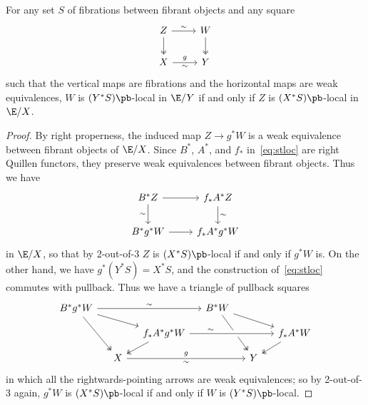 \begin{lem}\label{thm:fl-we}
  For any set $S$ of fibrations between fibrant objects and any square
  \[
    \begin{tikzcd}
      Z \ar[d,two heads] \ar[r,"\sim"] & W \ar[d,two heads] \\
      X \ar[r,"g","\sim"'] & Y
    \end{tikzcd}
  \]
  such that the vertical maps are fibrations and the horizontal maps are weak equivalences, $W$ is $(Y^*S)\pb$-local in $\E/Y$ if and only if $Z$ is $(X^*S)\pb$-local in $\E/X$.
\end{lem}
\begin{proof}
  By right properness, the induced map $Z \to g^*W$ is a weak equivalence between fibrant objects of $\E/X$.
  Since $B^*$, $A^*$, and $f_*$ in~\eqref{eq:stloc} are right Quillen functors, they preserve weak equivalences between fibrant objects.
  Thus we have
  \[
    \begin{tikzcd}
      B^*Z \ar[r] \ar[d,"\sim"'] & f_*A^* Z \ar[d,"\sim"] \\
      B^*g^*W \ar[r] & f_* A^* g^* W 
    \end{tikzcd}
  \]
  in $\E/X$, so that by 2-out-of-3 $Z$ is $(X^*S)\pb$-local if and only if $g^* W$ is.
  On the other hand, we have $g^*(Y^*S) = X^*S$, and the construction of~\eqref{eq:stloc} commutes with pullback. %
  Thus we have a triangle of pullback squares
  \[
    \begin{tikzcd}[row sep=small,column sep=small]
      B^*g^*W \ar[ddr,two heads] \ar[drr] \ar[rrr,"\sim"] &&& B^*W \ar[drr]\ar[ddr,two heads] \\
      && f_* A^* g^* W \ar[dl,two heads] \ar[rrr,near start,"\sim",crossing over] &&& f_* A^* W \ar[dl,two heads]\\
      & X \ar[rrr,"g","\sim"'] &&& Y
    \end{tikzcd}
  \]
  in which all the rightwards-pointing arrows are weak equivalences; so by 2-out-of-3 again, $g^*W$ is $(X^*S)\pb$-local if and only if $W$ is $(Y^*S)\pb$-local.
\end{proof}

